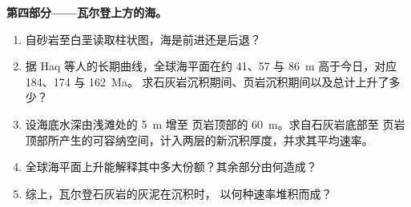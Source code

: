 \begin{problem}
\medskip\noindent\textbf{第四部分——瓦尔登上方的海。}
\begin{enumerate}[resume]
  \item 自砂岩至白垩读取柱状图，海是前进还是后退？
  \item 据 Haq 等人的长期曲线，全球海平面在约 41、57 与
        \qty{86}{m} 高于今日，对应 184、174 与 \qty{162}{Ma}。
        求石灰岩沉积期间、页岩沉积期间以及总计上升了多少？
  \item 设海底水深由浅滩处的 \qty{5}{m} 增至
        页岩顶部的 \qty{60}{m}。求自石灰岩底部至
        页岩顶部所产生的可容纳空间，计入两层的新沉积厚度，并求其平均速率。
  \item 全球海平面上升能解释其中多大份额？其余部分由何造成？
  \item 综上，瓦尔登石灰岩的灰泥在沉积时，
        以何种速率堆积而成？
\end{enumerate}
\end{problem}
